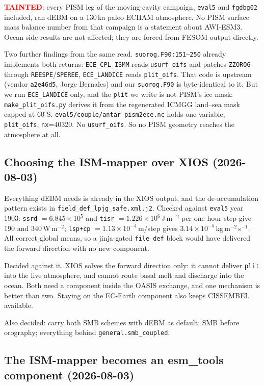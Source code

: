 \documentclass[11pt,a4paper]{article}
\newcommand{\code}[1]{\texttt{\small #1}}
\begin{document}
\textcolor{red}{\textbf{TAINTED}}: every PISM leg of the moving-cavity campaign, \code{eval5} and
\code{fgdbg02} included, ran dEBM on a 130\,ka paleo ECHAM atmosphere. No PISM surface mass
balance number from that campaign is a statement about AWI-ESM3. Ocean-side results are not
affected; they are forced from FESOM output directly.

Two further findings from the same read. \code{suorog.F90:151--250} already implements both
returns: \code{ECE\_CPL\_ISMM} reads \code{usurf\_oifs} and patches \code{ZZOROG} through
\code{REESPE}/\code{SPEREE}, \code{ECE\_LANDICE} reads \code{plit\_oifs}. That code is upstream
(vendor \code{a2e46d5}, Jorge Bernales) and our \code{suorog.F90} is byte-identical to it. But we
run \code{ECE\_LANDICE} only, and the \code{plit} we write is not PISM's ice mask:
\code{make\_plit\_oifs.py} derives it from the regenerated ICMGG land--sea mask capped at
$60^\circ$S. \code{eval5/couple/antar\_pism2ece.nc} holds one variable, \code{plit\_oifs},
\code{nx}=40320. No \code{usurf\_oifs}. So no PISM geometry reaches the atmosphere at all.

\subsection{Choosing the ISM-mapper over XIOS (2026-08-03)}

Everything dEBM needs is already in the XIOS output, and the de-accumulation pattern exists in
\code{field\_def\_lpjg\_safe.xml.j2}. Checked against \code{eval5} year 1903: \code{ssrd}
$=6.845\times10^5$ and \code{tisr} $=1.226\times10^6$\,J\,m$^{-2}$ per one-hour step give 190 and
340\,W\,m$^{-2}$; \code{lsp+cp} $=1.13\times10^{-4}$\,m/step gives
$3.14\times10^{-5}$\,kg\,m$^{-2}$\,s$^{-1}$. All correct global means, so a jinja-gated
\code{file\_def} block would have delivered the forward direction with no new component.

Decided against it. XIOS solves the forward direction only: it cannot deliver \code{plit} into the
live atmosphere, and cannot route basal melt and discharge into the ocean. Both need a component
inside the OASIS exchange, and one mechanism is better than two. Staying on the EC-Earth component
also keeps CISSEMBEL available.

Also decided: carry both SMB schemes with dEBM as default; SMB before orography; everything behind
\code{general.smb\_coupled}.

\subsection{The ISM-mapper becomes an esm\_tools component (2026-08-03)}
\end{document}
